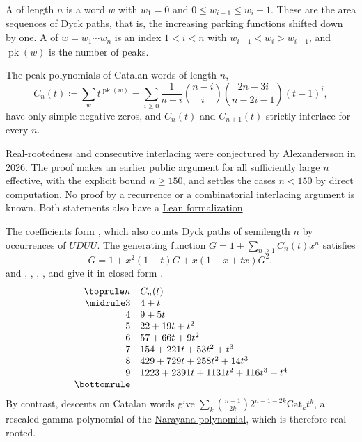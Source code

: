 \begin{example*}
\label{catalanWordPeaksRealRooted}
A \label{catalanWordDefinition} of length $n$ is a word
$w$ with $w_1=0$ and $0\leq w_{i+1}\leq w_i+1$.  These are the area
sequences of Dyck paths, that is, the increasing
parking functions shifted down by one.
A  of $w=w_1\dotsm w_n$ is an index $1\lt i\lt n$ with
$w_{i-1}\lt w_i\gt w_{i+1}$, and $\operatorname{pk}(w)$ is the number of peaks.

\begin{theorem}
\label{conjCatalanWordPeaks}
The peak polynomials of Catalan words of length $n$,
\[
  C_n(t)\coloneqq\sum_{w}t^{\operatorname{pk}(w)}
  =\sum_{i\geq0}\frac{1}{n-i}\binom{n-i}{i}\binom{2n-3i}{n-2i-1}(t-1)^i,
\]
have only simple negative zeros, and $C_n(t)$ and $C_{n+1}(t)$ strictly
interlace for every $n$.
\end{theorem}

Real-rootedness and consecutive interlacing were conjectured by
Alexandersson in 2026.  The proof makes an
\href{https://github.com/1337isnot1337/solved-conjectures/issues/59}{earlier
public argument} for all sufficiently large $n$ effective, with the explicit
bound $n\geq150$, and settles the cases $n\lt150$ by direct computation.
No proof by a recurrence or a combinatorial interlacing argument is known.
Both statements also have a
\href{https://github.com/ProgramComputer/open-math-research/blob/312293aa850010e9d9509d6850a482b9c7b7966f/topics/catalan-word-peaks/lean/CatalanStrictPeaksAllInterlacing.lean}{Lean
formalization}.

The coefficients form , which also counts Dyck paths of
semilength $n$ by occurrences of $UDUU$.  The generating function
$G=1+\sum_{n\geq1}C_n(t)x^n$ satisfies
\[
  G=1+x^2(1-t)G+x(1-x+tx)G^2,
\]
and , ,
, , and
 give it in closed form
\cite[Thm.~18]{BarilHarrisHarryMcClintonRamirez2025}.
\[
\begin{array}{rl}
\toprule
n & C_n(t) \\
\midrule
3 & 4+t \\
4 & 9+5t \\
5 & 22+19t+t^2 \\
6 & 57+66t+9t^2 \\
7 & 154+221t+53t^2+t^3 \\
8 & 429+729t+258t^2+14t^3 \\
9 & 1223+2391t+1131t^2+116t^3+t^4 \\
\bottomrule
\end{array}
\]
By contrast, descents on Catalan words give
$\sum_k\binom{n-1}{2k}2^{n-1-2k}\mathrm{Cat}_kt^k$, a rescaled
gamma-polynomial of the
\hyperref[classicalNarayanaPolynomialsRealRooted]{Narayana polynomial},
which is therefore real-rooted.
\end{example*}


